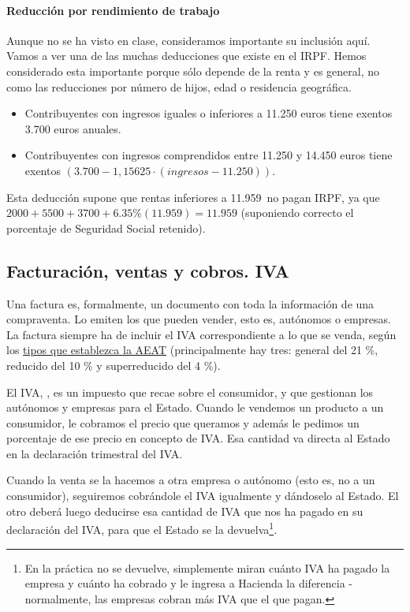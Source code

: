 \documentclass[nochap,palatino,shortheader]{apuntes}
\newcommand{\study}[1]{#1} \newcommand{\substudy}[1]{#1}
\begin{document}
\paragraph{Reducción por rendimiento de trabajo}

Aunque no se ha visto en clase, consideramos importante su inclusión aquí. Vamos a ver una de las muchas deducciones que existe en el IRPF. Hemos considerado esta importante porque sólo depende de la renta y es general, no como las reducciones por número de hijos, edad o residencia geográfica.

\begin{itemize}
\item Contribuyentes con ingresos iguales o inferiores a 11.250 euros tiene exentos 3.700 euros anuales.
\item Contribuyentes con ingresos comprendidos entre 11.250 y 14.450 euros tiene exentos $(3.700  - 1,15625 · (ingresos - 11.250))$.
\end{itemize}

Esta deducción supone que rentas inferiores a 11.959\texteuro\ no pagan IRPF, ya que $2000+5500+3700+6.35\% (11.959) = 11.959$ (suponiendo correcto el porcentaje de Seguridad Social retenido).

\subsection{Facturación, ventas y cobros. IVA}

Una factura es, formalmente, un documento con toda la información de una compraventa. Lo emiten los que pueden vender, esto es, autónomos o empresas. La factura siempre ha de incluir el IVA correspondiente a lo que se venda, según los \href{http://www.agenciatributaria.es/static_files/AEAT/Contenidos_Comunes/La_Agencia_Tributaria/Segmentos_Usuarios/Empresas_y_profesionales/Novedades_IVA_2014/Nuevos_tipos_IVA.pdf}{tipos que establezca la AEAT}
(principalmente hay tres: \substudy{general del 21 \%, reducido del 10 \% y superreducido del 4 \%}).

El IVA, , es un impuesto que recae sobre el consumidor, y que gestionan los autónomos y empresas para el Estado. Cuando le vendemos un producto a un consumidor, le cobramos el precio que queramos y además le pedimos un porcentaje de ese precio en concepto de IVA.
Esa cantidad va directa al Estado en la \study{declaración trimestral del IVA}.

Cuando la venta se la hacemos a otra empresa o autónomo (esto es, no a un consumidor), seguiremos cobrándole el IVA igualmente y dándoselo al Estado. El otro deberá luego deducirse esa cantidad de IVA que nos ha pagado en su declaración del IVA, para que el Estado se la devuelva\footnote{En la práctica no se devuelve, simplemente miran cuánto IVA ha pagado la empresa y cuánto ha cobrado y le ingresa a Hacienda la diferencia - normalmente, las empresas cobran más IVA que el que pagan.}.
\end{document}
